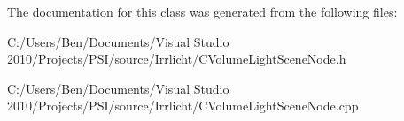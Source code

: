 The documentation for this class was generated from the following files\-:\begin{DoxyCompactItemize}
\item 
C\-:/\-Users/\-Ben/\-Documents/\-Visual Studio 2010/\-Projects/\-P\-S\-I/source/\-Irrlicht/C\-Volume\-Light\-Scene\-Node.\-h\item 
C\-:/\-Users/\-Ben/\-Documents/\-Visual Studio 2010/\-Projects/\-P\-S\-I/source/\-Irrlicht/C\-Volume\-Light\-Scene\-Node.\-cpp\end{DoxyCompactItemize}
